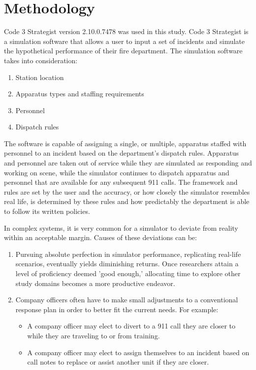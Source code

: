 \chapter{Methodology}
\label{chap:methodology}


Code 3 Strategist version 2.10.0.7478  was used in this study. Code 3 Strategist is a simulation software that allows a user to input a set of incidents and simulate the hypothetical performance of their fire department. The simulation software takes into consideration:

\begin{enumerate}
    \item Station location
    \item Apparatus types and staffing requirements
    \item Personnel
    \item Dispatch rules
\end{enumerate}

The software is capable of assigning a single, or multiple, apparatus staffed with personnel to an incident based on the department's dispatch rules. Apparatus and personnel are taken out of service while they are simulated as responding and working on scene, while the simulator continues to dispatch apparatus and personnel that are available for any subsequent 911 calls. The framework and rules are set by the user and the accuracy, or how closely the simulator resembles real life, is determined by these rules and how predictably the department is able to follow its written policies. 

In complex systems, it is very common for a simulator to deviate from reality within an acceptable margin. Causes of these deviations can be:

\begin{enumerate}
    \item Pursuing absolute perfection in simulator performance, replicating real-life scenarios, eventually yields diminishing returns. Once researchers attain a level of proficiency deemed 'good enough,' allocating time to explore other study domains becomes a more productive endeavor.
    \item Company officers often have to make small adjustments to a conventional response plan in order to better fit the current needs. For example:
    \begin{itemize}
        \item A company officer may elect to divert to a 911 call they are closer to while they are traveling to or from training.
        \item A company officer may elect to assign themselves to an incident based on call notes to replace or assist another unit if they are closer.
    \end{itemize}
\end{enumerate}

